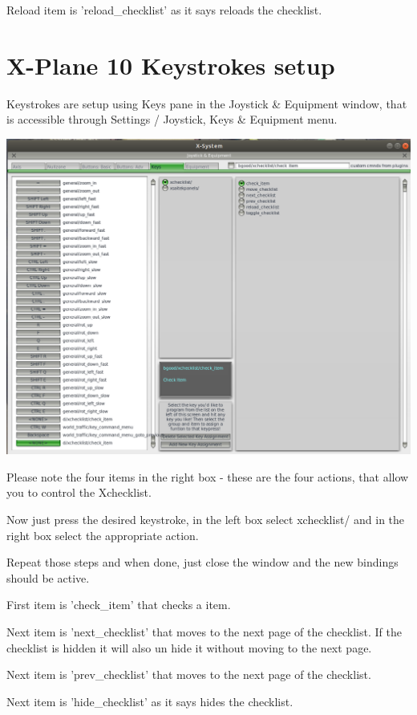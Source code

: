 \documentclass[11pt,parskip=half,a4paper]{scrartcl}
\begin{document}
Reload item is 'reload\_checklist' as it says reloads the checklist.

\newpage
\section{X-Plane 10 Keystrokes setup}
Keystrokes are setup using Keys pane in the Joystick \& Equipment window, that is accessible through 
Settings / Joystick, Keys \& Equipment menu.

\begin{center}
\includegraphics[width=16cm]{XP10_KeystrokesSetup.png}
\end{center}

Please note the four items in the right box - these are the four actions, that allow you to control the 
Xchecklist. 

Now just press the desired keystroke, in the left box select xchecklist/ and in the right box select the 
appropriate action. 

Repeat those steps and when done, just close the window and the new bindings should be active. 

First item is 'check\_item' that checks a item. 

Next item is 'next\_checklist' that moves to the next page of the checklist. If the checklist is hidden it 
will also un hide it without moving to the next page. 

Next item is 'prev\_checklist' that moves to the next page of the checklist.

Next item is 'hide\_checklist' as it says hides the checklist.
\end{document}
